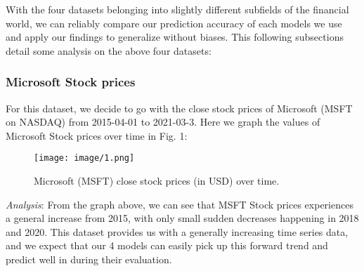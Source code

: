 \documentclass[letterpaper, 10 pt, conference]{ieeeconf}  %
\begin{document}
        \begin{table}[h!] \centering
            \caption{Datasets}
            \begin{threeparttable}
            \end{threeparttable}
        \end{table}

        With the four datasets belonging into slightly different subfields of the financial world, we can reliably compare our prediction accuracy of each models we use and apply our findings to generalize without biases. This following subsections detail some analysis on the above four datasets:

        \subsubsection{Microsoft Stock prices} For this dataset, we decide to go with the close stock prices of Microsoft (MSFT on NASDAQ) from 2015-04-01 to 2021-03-3. Here we graph the values of Microsoft Stock prices over time in Fig. 1:
        \begin{figure}[thpb]
            \centering
            \texttt{[image: image/1.png]}
            \caption{Microsoft (MSFT) close stock prices (in USD) over time.}
            \label{figurelabel}
        \end{figure}
        
        \textit{Analysis}: From the graph above, we can see that MSFT Stock prices experiences a general increase from 2015, with only small sudden decreases happening in 2018 and 2020. This dataset provides us with a generally increasing time series data, and we expect that our 4 models can easily pick up this forward trend and predict well in during their evaluation. 
\end{document}
